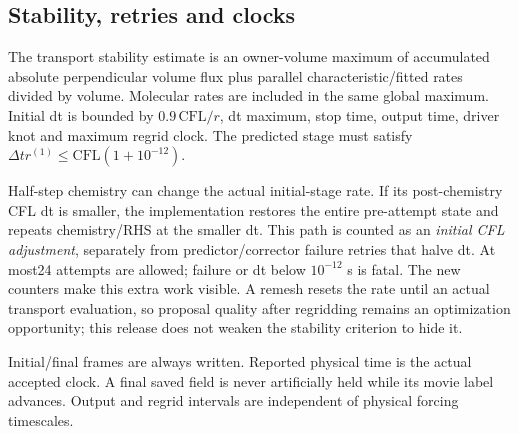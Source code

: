 \subsection{Stability, retries and clocks}
The transport stability estimate is an owner-volume maximum of accumulated
absolute perpendicular volume flux plus parallel characteristic/fitted
rates divided by volume. Molecular rates are included in the same global
maximum. Initial dt is bounded by $0.9\,\mathrm{CFL}/r$, dt maximum, stop
time, output time, driver knot and maximum regrid clock. The predicted stage
must satisfy $\Delta t r^{(1)}\le\mathrm{CFL}(1+10^{-12})$.

Half-step chemistry can change the actual initial-stage rate. If its
post-chemistry CFL dt is smaller, the implementation restores the entire
pre-attempt state and repeats chemistry/RHS at the smaller dt. This path
is counted as an \emph{initial CFL adjustment}, separately from
predictor/corrector failure retries that halve dt. At most24 attempts are
allowed; failure or dt below $10^{-12}$ s is fatal. The new counters make
this extra work visible. A remesh resets the rate until an actual transport
evaluation, so proposal quality after regridding remains an optimization
opportunity; this release does not weaken the stability criterion to hide it.

Initial/final frames are always written. Reported physical time is the
actual accepted clock. A final saved field is never artificially held
while its movie label advances. Output and regrid intervals are independent
of physical forcing timescales.
